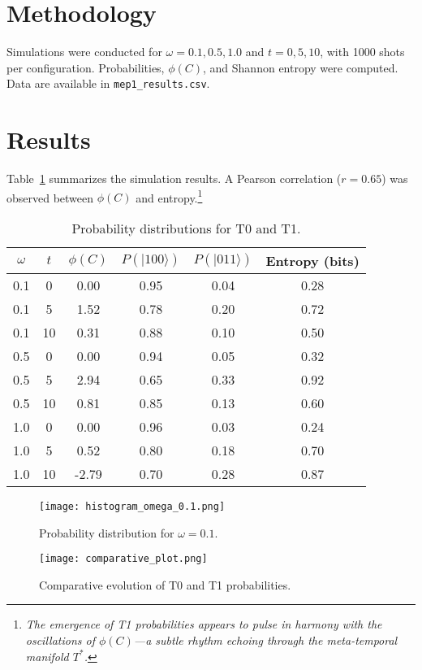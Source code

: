 \section{Methodology}
Simulations were conducted for $\omega = 0.1, 0.5, 1.0$ and $t = 0, 5, 10$, with 1000 shots per configuration. Probabilities, $\phi(C)$, and Shannon entropy were computed. Data are available in \texttt{mep1\_results.csv}.

\section{Results}
Table~\ref{tab:results} summarizes the simulation results. A Pearson correlation ($r = 0.65$) was observed between $\phi(C)$ and entropy.\footnote{\emph{The emergence of T1 probabilities appears to pulse in harmony with the oscillations of $\phi(C)$---a subtle rhythm echoing through the meta-temporal manifold $T^*$.}}

\begin{table}[h]
\centering
\begin{tabular}{|c|c|c|c|c|c|}
\hline
$\omega$ & $t$ & $\phi(C)$ & $P(|100\rangle)$ & $P(|011\rangle)$ & Entropy (bits) \\
\hline
0.1 & 0 & 0.00 & 0.95 & 0.04 & 0.28 \\
0.1 & 5 & 1.52 & 0.78 & 0.20 & 0.72 \\
0.1 & 10 & 0.31 & 0.88 & 0.10 & 0.50 \\
0.5 & 0 & 0.00 & 0.94 & 0.05 & 0.32 \\
0.5 & 5 & 2.94 & 0.65 & 0.33 & 0.92 \\
0.5 & 10 & 0.81 & 0.85 & 0.13 & 0.60 \\
1.0 & 0 & 0.00 & 0.96 & 0.03 & 0.24 \\
1.0 & 5 & 0.52 & 0.80 & 0.18 & 0.70 \\
1.0 & 10 & -2.79 & 0.70 & 0.28 & 0.87 \\
\hline
\end{tabular}
\caption{Probability distributions for T0 and T1.}
\label{tab:results}
\end{table}

\begin{figure}[h]
\centering
\texttt{[image: histogram\_omega\_0.1.png]}
\caption{Probability distribution for $\omega = 0.1$.}
\label{fig:hist_0.1}
\end{figure}
\begin{figure}[h]
\centering
\texttt{[image: comparative\_plot.png]}
\caption{Comparative evolution of T0 and T1 probabilities.}
\label{fig:comparative}
\end{figure}

